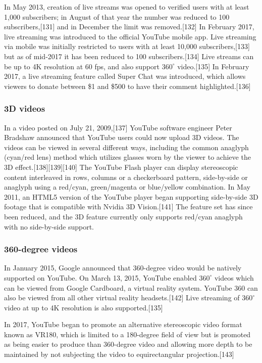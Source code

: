 \documentclass[12pt]{article}
\begin{document}
In May 2013, creation of live streams was opened to verified users with at least 1,000 subscribers; in August of that year the number was reduced to 100 subscribers,[131] and in December the limit was removed.[132] In February 2017, live streaming was introduced to the official YouTube mobile app. Live streaming via mobile was initially restricted to users with at least 10,000 subscribers,[133] but as of mid-2017 it has been reduced to 100 subscribers.[134] Live streams can be up to 4K resolution at 60 fps, and also support $360^{\circ}$ video.[135] In February 2017, a live streaming feature called Super Chat was introduced, which allows viewers to donate between \$1 and \$500 to have their comment highlighted.[136] 



\subsubsection{3D videos}

In a video posted on July 21, 2009,[137] YouTube software engineer Peter Bradshaw announced that YouTube users could now upload 3D videos. The videos can be viewed in several different ways, including the common anaglyph (cyan/red lens) method which utilizes glasses worn by the viewer to achieve the 3D effect.[138][139][140] The YouTube Flash player can display stereoscopic content interleaved in rows, columns or a checkerboard pattern, side-by-side or anaglyph using a red/cyan, green/magenta or blue/yellow combination. In May 2011, an HTML5 version of the YouTube player began supporting side-by-side 3D footage that is compatible with Nvidia 3D Vision.[141] The feature set has since been reduced, and the 3D feature currently only supports red/cyan anaglyph with no side-by-side support. 




\subsubsection{360-degree videos}

In January 2015, Google announced that 360-degree video would be natively supported on YouTube. On March 13, 2015, YouTube enabled $360^{\circ}$ videos which can be viewed from Google Cardboard, a virtual reality system. YouTube 360 can also be viewed from all other virtual reality headsets.[142] Live streaming of $360^{\circ}$ video at up to 4K resolution is also supported.[135]

In 2017, YouTube began to promote an alternative stereoscopic video format known as VR180, which is limited to a 180-degree field of view but is promoted as being easier to produce than 360-degree video and allowing more depth to be maintained by not subjecting the video to equirectangular projection.[143] 
\end{document}
